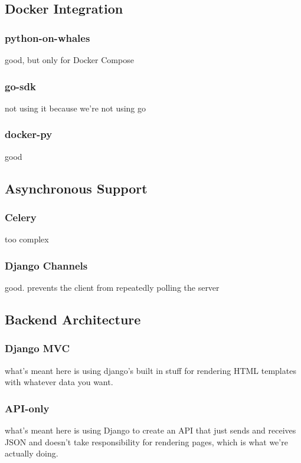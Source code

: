 \documentclass[12pt]{article}
\begin{document}
\subsection{Docker Integration}

\subsubsection{python-on-whales}
good, but only for Docker Compose

\subsubsection{go-sdk}
not using it because we're not using go

\subsubsection{docker-py}
good

\subsection{Asynchronous Support}

\subsubsection{Celery}
too complex

\subsubsection{Django Channels}
good. prevents the client from repeatedly polling the server

\subsection{Backend Architecture}

\subsubsection{Django MVC}
what's meant here is using django's built in stuff for rendering HTML templates with whatever data you want.

\subsubsection{API-only}
what's meant here is using Django to create an API that just sends and receives JSON and doesn't take responsibility for rendering pages, which is what we're actually doing.
\end{document}
